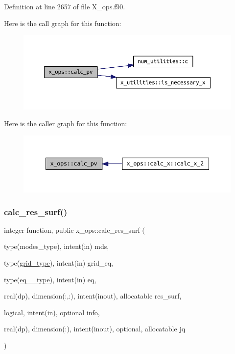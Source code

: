 Definition at line 2657 of file X\+\_\+ops.\+f90.

Here is the call graph for this function\+:\nopagebreak
\begin{figure}[H]
\begin{center}
\leavevmode
\includegraphics[width=350pt]{namespacex__ops_a51f3bf0b4c8d688ffbcc3a1adbca9762_cgraph}
\end{center}
\end{figure}
Here is the caller graph for this function\+:\nopagebreak
\begin{figure}[H]
\begin{center}
\leavevmode
\includegraphics[width=350pt]{namespacex__ops_a51f3bf0b4c8d688ffbcc3a1adbca9762_icgraph}
\end{center}
\end{figure}
\mbox{\label{namespacex__ops_a1a90026bbbeddc25e82cfdd304df251f}} 
\subsubsection{\texorpdfstring{calc\+\_\+res\+\_\+surf()}{calc\_res\_surf()}}
{\footnotesize\ttfamily integer function, public x\+\_\+ops\+::calc\+\_\+res\+\_\+surf (\begin{DoxyParamCaption}\item[{type(modes\+\_\+type), intent(in)}]{mds,  }\item[{type(\hyperlink{structgrid__vars_1_1grid__type}{grid\+\_\+type}), intent(in)}]{grid\+\_\+eq,  }\item[{type(\hyperlink{structeq__vars_1_1eq__1__type}{eq\+\_\+1\+\_\+type}), intent(in)}]{eq,  }\item[{real(dp), dimension(\+:,\+:), intent(inout), allocatable}]{res\+\_\+surf,  }\item[{logical, intent(in), optional}]{info,  }\item[{real(dp), dimension(\+:), intent(inout), optional, allocatable}]{jq }\end{DoxyParamCaption})}




